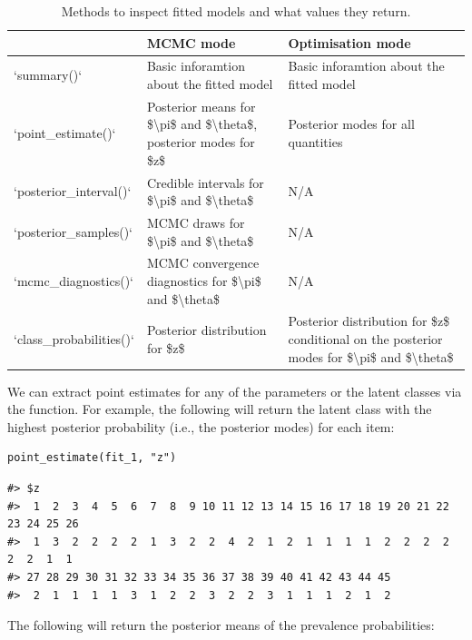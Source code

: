 \begin{table}

\caption{\label{tab:inspecting-fitted-models}Methods to inspect fitted models and what values they return.}
\centering
\begin{tabular}[t]{l|l|l}
\hline
  & MCMC mode & Optimisation mode\\
\hline
`summary()` & Basic inforamtion about the fitted model & Basic inforamtion about the fitted model\\
\hline
`point\_estimate()` & Posterior means for \$\textbackslash{}pi\$ and \$\textbackslash{}theta\$, posterior modes for \$z\$ & Posterior modes for all quantities\\
\hline
`posterior\_interval()` & Credible intervals for \$\textbackslash{}pi\$ and \$\textbackslash{}theta\$ & N/A\\
\hline
`posterior\_samples()` & MCMC draws for \$\textbackslash{}pi\$ and \$\textbackslash{}theta\$ & N/A\\
\hline
`mcmc\_diagnostics()` & MCMC convergence diagnostics for \$\textbackslash{}pi\$ and \$\textbackslash{}theta\$ & N/A\\
\hline
`class\_probabilities()` & Posterior distribution for \$z\$ & Posterior distribution for \$z\$ conditional on the
                          posterior modes for \$\textbackslash{}pi\$ and \$\textbackslash{}theta\$\\
\hline
\end{tabular}
\end{table}

We can extract point estimates for any of the parameters or the latent classes
via the  function. For example, the following will
return the latent class with the highest posterior probability (i.e., the
posterior modes) for each item:

\begin{verbatim}
point_estimate(fit_1, "z")
\end{verbatim}

\begin{verbatim}
#> $z
#>  1  2  3  4  5  6  7  8  9 10 11 12 13 14 15 16 17 18 19 20 21 22 23 24 25 26 
#>  1  3  2  2  2  2  1  3  2  2  4  2  1  2  1  1  1  1  2  2  2  2  2  2  1  1 
#> 27 28 29 30 31 32 33 34 35 36 37 38 39 40 41 42 43 44 45 
#>  2  1  1  1  1  3  1  2  2  3  2  2  3  1  1  1  2  1  2
\end{verbatim}

The following will return the posterior means of the prevalence probabilities:

